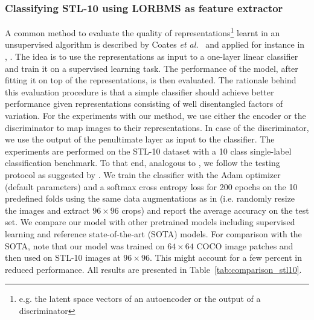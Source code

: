 \documentclass[12pt,a4paper]{article}
\begin{document}
\subsubsection{Classifying STL-10 using LORBMS as feature extractor}\label{subsec:linearclassifier}
A common method to evaluate the quality of representations\footnote{e.g. the latent space vectors of an autoencoder or the output of a discriminator} learnt in an unsupervised algorithm is described by Coates \textit{et al.}~\cite{singleLayerNetworks} and applied for instance in \cite{DCGAN}, \cite{AE_Interp}. The idea is to use the representations as input to a one-layer linear classifier and train it on a supervised learning task. The performance of the model, after fitting it on top of the representations, is then evaluated. The rationale behind this evaluation procedure is that a simple classifier should achieve better performance given representations consisting of well disentangled factors of variation. For the experiments with our method, we use either the encoder or the discriminator to map images to their representations. In case of the discriminator, we use the output of the penultimate layer as input to the classifier. The experiments are performed on the STL-10 dataset with a 10 class single-label classification benchmark. To that end, analogous to \cite{SpotArtifacts}, we follow the testing protocol as suggested by \cite{singleLayerNetworks}. We train the classifier with the Adam optimizer (default parameters) and a softmax cross entropy loss for 200 epochs on the 10 predefined folds using the same data augmentations as in \cite{SpotArtifacts} (i.e. randomly resize the images and extract $96 \times 96$ crops) and report the average accuracy on the test set. We compare our model with other pretrained models including supervised learning and reference state-of-the-art (SOTA) models. For comparison with the SOTA, note that our model was trained on $64 \times 64$ COCO image patches and then used on STL-10 images at $96 \times 96$. This might account for a few percent in reduced performance. All results are presented in Table~\ref{tab:comparison_stl10}.

\end{document}
